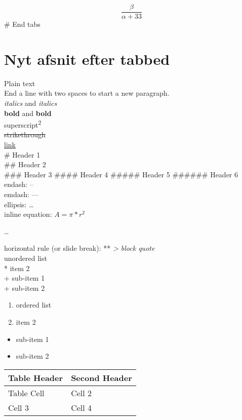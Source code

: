 \documentclass[]{book}
\providecommand{\tightlist}{%
  \setlength{\itemsep}{0pt}\setlength{\parskip}{0pt}}
\theoremstyle{definition}
\theoremstyle{definition}
\theoremstyle{definition}
\theoremstyle{remark}
\begin{document}
\[\frac{\beta}{\alpha+33}\] \# End tabs

\hypertarget{nyt-afsnit-efter-tabbed}{%
\section{Nyt afsnit efter tabbed}\label{nyt-afsnit-efter-tabbed}}

Plain text\\
End a line with two spaces to start a new paragraph.\\
\emph{italics} and \emph{italics}\\
\textbf{bold} and \textbf{bold}\\
superscript\textsuperscript{2}\\
\sout{strikethrough}\\
\href{www.rstudio.com}{link}\\
\# Header 1\\
\#\# Header 2\\
\#\#\# Header 3 \#\#\#\# Header 4 \#\#\#\#\# Header 5 \#\#\#\#\#\#
Header 6 endash: --\\
emdash: ---\\
ellipsis: \ldots{}\\
inline equation: \(A = \pi*r^{2}\)

\ldots{}

horizontal rule (or slide break): **\emph{ \textgreater{} block quote\\
} unordered list\\
* item 2\\
+ sub-item 1\\
+ sub-item 2

\begin{enumerate}
\def\labelenumi{\arabic{enumi}.}
\tightlist
\item
  ordered list\\
\item
  item 2\\
\end{enumerate}

\begin{itemize}
\tightlist
\item
  sub-item 1\\
\item
  sub-item 2
\end{itemize}

\begin{longtable}[]{@{}ll@{}}
\toprule
Table Header & Second Header\tabularnewline
\midrule
\endhead
Table Cell & Cell 2\tabularnewline
Cell 3 & Cell 4\tabularnewline
\bottomrule
\end{longtable}
\end{document}
